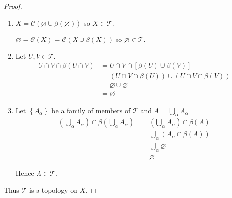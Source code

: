 \begin{proof}
    \begin{enumerate}[label={(\roman*)}]
        \item \( X = \mathscr{C}(\varnothing \cup \beta(\varnothing)) \) so \( X \in \mathscr{T} \).

              \( \varnothing = \mathscr{C}(X) = \mathscr{C}(X \cup \beta(X)) \) so \( \varnothing \in \mathscr{T} \).
        \item Let \( U, V \in \mathscr{T} \).
              \begingroup
              \allowdisplaybreaks%
              \begin{align*}
                  U \cap V \cap \beta(U \cap V) & = U \cap V \cap \left[\beta(U) \cup \beta(V)\right]      \\
                                                & = (U \cap V \cap \beta(U)) \cup (U \cap V \cap \beta(V)) \\
                                                & = \varnothing \cup \varnothing                           \\
                                                & = \varnothing.
              \end{align*}
              \endgroup
        \item Let \( \left\{ A_{\alpha} \right\} \) be a family of members of \( \mathscr{T} \) and \( A = \bigcup_{\alpha} A_{\alpha} \)
              \begingroup
              \allowdisplaybreaks%
              \begin{align*}
                  \left(\bigcup_{\alpha} A_{\alpha}\right) \cap \beta\left(\bigcup_{\alpha} A_{\alpha}\right) & = \left(\bigcup_{\alpha} A_{\alpha}\right) \cap \beta(A) \\
                                                                                                              & = \bigcup_{\alpha} (A_{\alpha} \cap \beta(A))            \\
                                                                                                              & = \bigcup_{\alpha} \varnothing                           \\
                                                                                                              & = \varnothing
              \end{align*}
              \endgroup

              Hence \( A \in \mathscr{T} \).
    \end{enumerate}

    Thus \( \mathscr{T} \) is a topology on \(X\).


\end{proof}

